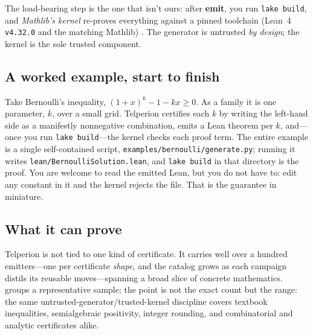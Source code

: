 The load-bearing step is the one that isn't ours: after \textbf{emit}, you run
\texttt{lake build}, and \emph{Mathlib's kernel} re-proves everything against a
pinned toolchain (Lean~4 \texttt{v4.32.0} and the matching Mathlib)
\cite{lean4,mathlib}. The generator is untrusted \emph{by design}; the kernel is
the sole trusted component.

\subsection{A worked example, start to finish}

Take Bernoulli's inequality, $(1+x)^k - 1 - kx \ge 0$. As a family it is one
parameter, $k$, over a small grid. Telperion certifies each $k$ by writing the
left-hand side as a manifestly nonnegative combination, emits a Lean theorem per
$k$, and---once you run \texttt{lake build}---the kernel checks each proof term.
The entire example is a single self-contained script,
\texttt{examples/bernoulli/generate.py}; running it writes
\texttt{lean/BernoulliSolution.lean}, and \texttt{lake build} in that directory
is the proof. You are welcome to read the emitted Lean, but you do not have to:
edit any constant in it and the kernel rejects the file. That is the guarantee in
miniature.

\subsection{What it can prove}

Telperion is not tied to one kind of certificate. It carries well over a hundred
emitters---one per certificate \emph{shape}, and the catalog grows as each
campaign distils its reusable moves---spanning a broad slice of concrete
mathematics.  groups a representative sample; the point is not
the exact count but the range: the same untrusted-generator/trusted-kernel
discipline covers textbook inequalities, semialgebraic positivity, integer
rounding, and combinatorial and analytic certificates alike.

